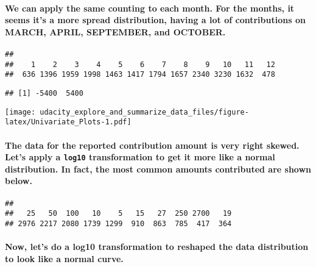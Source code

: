 \documentclass[]{article}
\let\oldparagraph\paragraph
\renewcommand{\paragraph}[1]{\oldparagraph{#1}\mbox{}}
\begin{document}
\paragraph{We can apply the same counting to each month. For the months,
it seems it's a more spread distribution, having a lot of contributions
on MARCH, APRIL, SEPTEMBER, and
OCTOBER.}\label{we-can-apply-the-same-counting-to-each-month.-for-the-months-it-seems-its-a-more-spread-distribution-having-a-lot-of-contributions-on-march-april-september-and-october.}

\begin{verbatim}
## 
##    1    2    3    4    5    6    7    8    9   10   11   12 
##  636 1396 1959 1998 1463 1417 1794 1657 2340 3230 1632  478
\end{verbatim}

\begin{verbatim}
## [1] -5400  5400
\end{verbatim}

\texttt{[image: udacity\_explore\_and\_summarize\_data\_files/figure-latex/Univariate\_Plots-1.pdf]}

\paragraph{\texorpdfstring{The data for the reported contribution amount
is very right skewed. Let's apply a \texttt{log10} transformation to get
it more like a normal distribution. In fact, the most common amounts
contributed are shown
below.}{The data for the reported contribution amount is very right skewed. Let's apply a log10 transformation to get it more like a normal distribution. In fact, the most common amounts contributed are shown below.}}\label{the-data-for-the-reported-contribution-amount-is-very-right-skewed.-lets-apply-a-log10-transformation-to-get-it-more-like-a-normal-distribution.-in-fact-the-most-common-amounts-contributed-are-shown-below.}

\begin{verbatim}
## 
##   25   50  100   10    5   15   27  250 2700   19 
## 2976 2217 2080 1739 1299  910  863  785  417  364
\end{verbatim}

\paragraph{Now, let's do a log10 transformation to reshaped the data
distribution to look like a normal
curve.}\label{now-lets-do-a-log10-transformation-to-reshaped-the-data-distribution-to-look-like-a-normal-curve.}
\end{document}
